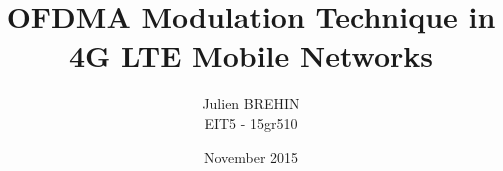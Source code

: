




\title{OFDMA Modulation Technique in 4G LTE Mobile Networks}
\author{Julien BREHIN\\EIT5 - 15gr510}
\date{November 2015}
\begin{titlepage}
\maketitle
\end{titlepage}

\tableofcontents









\printbibliography

